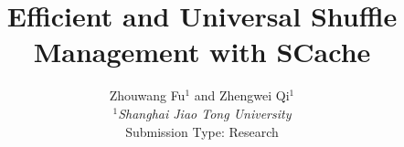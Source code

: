 \documentclass[10pt,twocolumn]{article}
\begin{document}
\title{Efficient and Universal Shuffle Management with SCache}
\author{Zhouwang Fu$^1$ and Zhengwei Qi$^1$ \\
\small {\em  $^1$Shanghai Jiao Tong University} \\ [2mm]
\small Submission Type: Research
}
\date{}
\maketitle















\end{document}

